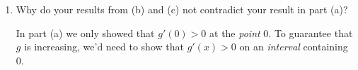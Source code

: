 \documentclass[letterpaper,12pt]{article}
\begin{document}
\begin{enumerate}
\begin{enumerate}
 \bigskip
 
 \item Why do your results from (b) and (c) not contradict your result in part (a)?

 \bigskip
 
 In part (a) we only showed that $g'(0)>0$ at the {\em point} 0. To guarantee that $g$ is increasing, we'd need to show that $g'(x)>0$ on an {\em interval} containing 0.
\end{enumerate}
 




\end{enumerate}
\end{document}
